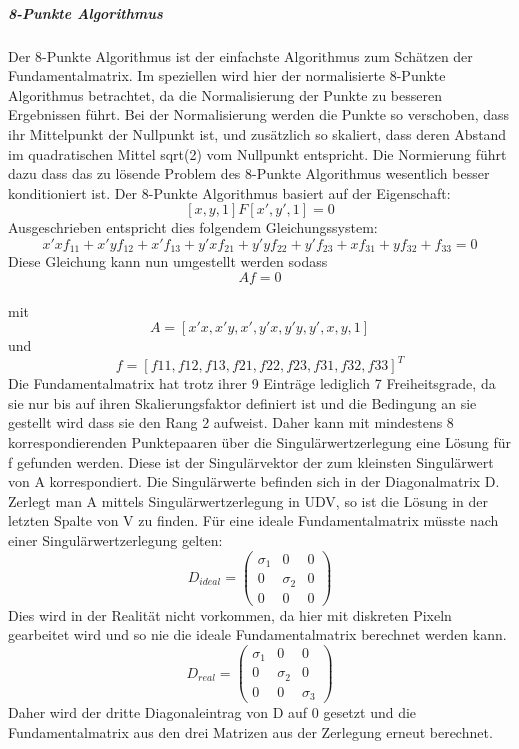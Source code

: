 \subparagraph{8-Punkte Algorithmus}
Der 8-Punkte Algorithmus ist der einfachste Algorithmus zum Schätzen der Fundamentalmatrix. Im speziellen wird hier der normalisierte 8-Punkte Algorithmus betrachtet, da die Normalisierung der Punkte zu besseren Ergebnissen führt.
Bei der Normalisierung werden die Punkte so verschoben, dass ihr Mittelpunkt der Nullpunkt ist, und zusätzlich so skaliert, dass deren Abstand im quadratischen Mittel sqrt(2) vom Nullpunkt entspricht. Die Normierung führt dazu dass das zu lösende Problem des 8-Punkte Algorithmus wesentlich besser konditioniert ist.
Der 8-Punkte Algorithmus basiert auf der Eigenschaft:
$$[x,y,1] F [x',y',1] = 0$$
Ausgeschrieben entspricht dies folgendem Gleichungssystem:
\\
$$x'xf_{11} + x'yf_{12}  + x'f_{13} + y'xf_{21} + y'yf_{22} + y'f_{23} + xf_{31} + yf_{32} + f_{33} = 0$$
Diese Gleichung kann nun umgestellt werden sodass
\\
$$Af = 0$$
\\
mit
$$A = [x'x, x'y, x', y'x, y'y, y', x,y,1]$$
und
$$f = [f11,f12,f13,f21,f22,f23,f31,f32,f33]^T$$
Die Fundamentalmatrix hat trotz ihrer 9 Einträge lediglich 7 Freiheitsgrade, da sie nur bis auf ihren Skalierungsfaktor definiert ist und die Bedingung an sie gestellt wird dass sie den Rang 2 aufweist. Daher kann mit mindestens 8 korrespondierenden Punktepaaren über die Singulärwertzerlegung eine Lösung für f gefunden werden. Diese ist der Singulärvektor der zum kleinsten Singulärwert von A korrespondiert. Die Singulärwerte befinden sich in der Diagonalmatrix D. Zerlegt man A mittels Singulärwertzerlegung in UDV, so ist die Lösung in der letzten Spalte von V zu finden.
Für eine ideale Fundamentalmatrix müsste nach einer Singulärwertzerlegung gelten:
$$D_{ideal} = \begin{pmatrix} \sigma_1 & 0 & 0\\0 & \sigma_2 & 0 \\0 & 0 & 0 \end{pmatrix}$$
Dies wird in der Realität nicht vorkommen, da hier mit diskreten Pixeln gearbeitet wird und so nie die ideale Fundamentalmatrix berechnet werden kann.
$$D_{real} = \begin{pmatrix} \sigma_1 & 0 & 0\\0 & \sigma_2 & 0 \\0 & 0 & \sigma_3 \end{pmatrix}$$
Daher wird der dritte Diagonaleintrag von D auf 0 gesetzt und die Fundamentalmatrix aus den drei Matrizen aus der Zerlegung erneut berechnet. \cite{Richard2000} \cite{Schreer2005}

